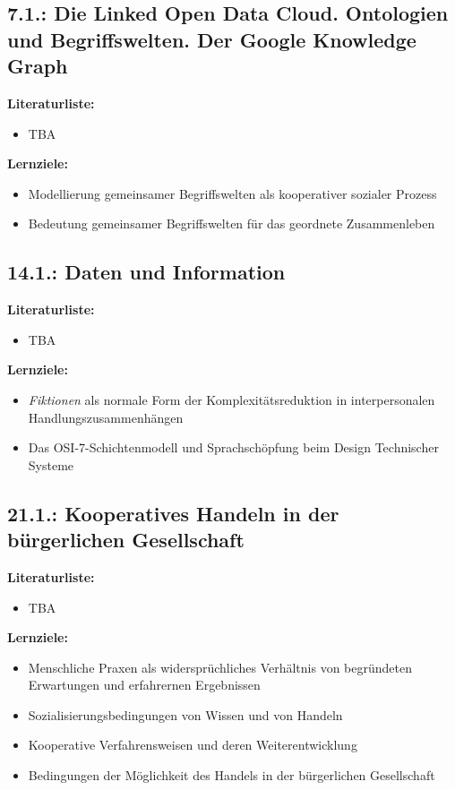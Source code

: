 \documentclass[11pt,a4paper]{article}
\begin{document}
\subsection{7.1.: Die Linked Open Data Cloud. Ontologien und Begriffswelten.
Der Google Knowledge Graph}

\textbf{Literaturliste:}
\begin{itemize}
\item TBA
\end{itemize}

\textbf{Lernziele:}
\begin{itemize}[noitemsep]
\item Modellierung gemeinsamer Begriffswelten als kooperativer sozialer
  Prozess 
\item Bedeutung gemeinsamer Begriffswelten für das geordnete Zusammenleben 
\end{itemize}

\subsection{14.1.: Daten und Information}

\textbf{Literaturliste:}
\begin{itemize}
\item TBA
\end{itemize}

\textbf{Lernziele:}
\begin{itemize}[noitemsep]
\item \emph{Fiktionen} als normale Form der Komplexitätsreduktion in
  interpersonalen Handlungszusammenhängen
\item Das OSI-7-Schichtenmodell und Sprachschöpfung beim Design Technischer
  Systeme  
\end{itemize}

\subsection{21.1.: Kooperatives Handeln in der bürgerlichen Gesellschaft}

\textbf{Literaturliste:}
\begin{itemize}
\item TBA
\end{itemize}

\textbf{Lernziele:}
\begin{itemize}[noitemsep]
\item Menschliche Praxen als widersprüchliches Verhältnis von begründeten
  Erwartungen und erfahrernen Ergebnissen
\item Sozialisierungsbedingungen von Wissen und von Handeln
\item Kooperative Verfahrensweisen und deren Weiterentwicklung
\item Bedingungen der Möglichkeit des Handels in der bürgerlichen Gesellschaft 
\end{itemize}
\end{document}
